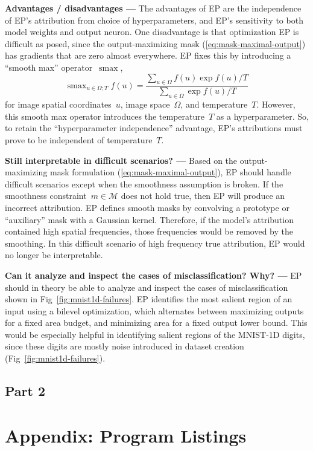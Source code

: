 \documentclass{article}
\DeclareMathOperator*{\smax}{smax}
\newcommand{\myparagraph}[1]{\noindent\textbf{#1 ---}}
\begin{document}
\myparagraph{Advantages / disadvantages} The advantages of EP are the independence of EP's attribution from choice of hyperparameters, and EP's sensitivity to both model weights and output neuron.
One disadvantage is that optimization EP is difficult as posed, since the output-maximizing mask (\ref{eq:mask-maximal-output}) has gradients that are zero almost everywhere.
EP fixes this by introducing a ``smooth max'' operator~$\smax$,
\begin{equation}
	\smax_{u\in\Omega; T} f(u) = \frac{\sum_{u\in\Omega}f(u)\exp f(u)/T}{\sum_{u\in\Omega}\exp f(u)/T}
	\label{eq:smax}
\end{equation}
for image spatial coordinates~$u$, image space~$\Omega$, and temperature~$T$.
However, this smooth max operator introduces the temperature~$T$ as a hyperparameter.
So, to retain the ``hyperparameter independence'' advantage, EP's attributions must prove to be independent of temperature~$T$.


\myparagraph{Still interpretable in difficult scenarios?} Based on the output-maximizing mask formulation (\ref{eq:mask-maximal-output}), EP should handle difficult scenarios except when the smoothness assumption is broken.
If the smoothness constraint~$m\in\mathcal{M}$ does not hold true, then EP will produce an incorrect attribution.
EP defines smooth masks by convolving a prototype or ``auxiliary'' mask with a Gaussian kernel.
Therefore, if the model's attribution contained high spatial frequencies, those frequencies would be removed by the smoothing.
In this difficult scenario of high frequency true attribution, EP would no longer be interpretable.


\myparagraph{Can it analyze and inspect the cases of misclassification? Why?} EP should in theory be able to analyze and inspect the cases of misclassification shown in Fig~\ref{fig:mnist1d-failures}.
EP identifies the most salient region of an input using a bilevel optimization, which alternates between maximizing outputs for a fixed area budget, and minimizing area for a fixed output lower bound.
This would be especially helpful in identifying salient regions of the MNIST-1D digits, since these digits are mostly noise introduced in dataset creation (Fig~\ref{fig:mnist1d-failures}).


\subsection{Part 2}


\clearpage
\appendix
\section{Appendix: Program Listings}
\end{document}
